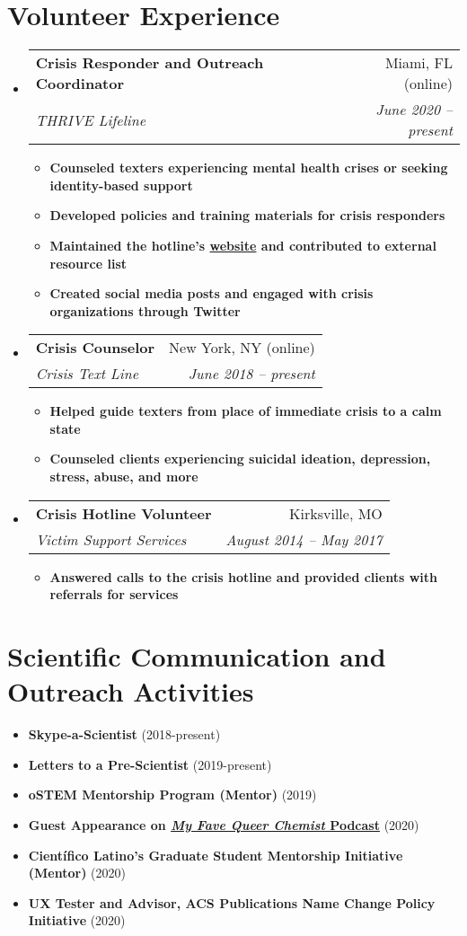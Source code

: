 \documentclass[letterpaper,11pt]{article}
\makeatletter
\newcommand{\resumeItem}[2]{
  \item\small{
    \textbf{#1}{ #2 \vspace{-2pt}}
  }
}
\newcommand{\resumeSubheading}[4]{
  \vspace{-1pt}\item
    \begin{tabular*}{0.97\textwidth}[t]{l@{\extracolsep{\fill}}r}
      \textbf{#1} & #2 \\
      \textit{\small#3} & \textit{\small #4} \\
    \end{tabular*}\vspace{-5pt}
}
\newcommand{\resumeSubItem}[2]{\resumeItem{#1}{#2}\vspace{-4pt}}
\newcommand{\resumeSubHeadingListStart}{\begin{itemize}[leftmargin=*]}
\newcommand{\resumeSubHeadingListEnd}{\end{itemize}}
\newcommand{\resumeItemListStart}{\begin{itemize}}
\newcommand{\resumeItemListEnd}{\end{itemize}\vspace{-5pt}}
\makeatother
\begin{document}
\section{Volunteer Experience}
  \resumeSubHeadingListStart

    \resumeSubheading
      {Crisis Responder and Outreach Coordinator}{Miami, FL (online)}
      {THRIVE Lifeline}{June 2020 -- present}
      \resumeItemListStart
        \resumeItem{\textnormal{Counseled texters experiencing mental health crises or seeking identity-based support}}
          {}
        \resumeItem{\textnormal{Developed policies and training materials for crisis responders}}
          {}
        \resumeItem{\textnormal{Maintained the hotline's \href{https://thrivelifeline.org/}{website} and contributed to external resource list}}
          {}
        \resumeItem{\textnormal{Created social media posts and engaged with crisis organizations through Twitter}}
          {}
      \resumeItemListEnd

    \resumeSubheading
      {Crisis Counselor}{New York, NY (online)}
      {Crisis Text Line}{June 2018 -- present}
      \resumeItemListStart
        \resumeItem{\textnormal{Helped guide texters from place of immediate crisis to a calm state}}
          {}
        \resumeItem{\textnormal{Counseled clients experiencing suicidal ideation, depression, stress, abuse, and more}}
          {}
      \resumeItemListEnd

    \resumeSubheading
      {Crisis Hotline Volunteer}{Kirksville, MO}
      {Victim Support Services}{August 2014 -- May 2017}
      \resumeItemListStart
        \resumeItem{\textnormal{Answered calls to the crisis hotline and provided clients with referrals for services}}
          {}
      \resumeItemListEnd
  \resumeSubHeadingListEnd


\section{Scientific Communication and Outreach Activities}
  \resumeSubHeadingListStart
   \resumeSubItem{Skype-a-Scientist}
      {(2018-present)}
    \resumeSubItem{Letters to a Pre-Scientist}
      {(2019-present)}
    \resumeSubItem{oSTEM Mentorship Program (Mentor)}
      {(2019)}
    \resumeSubItem{Guest Appearance on \href{https://www.stitcher.com/show/my-fave-queer-chemist/episode/emmett-leddin-university-of-north-texas-69219314}{\emph{My Fave Queer Chemist} Podcast}}
      {(2020)}%
    \resumeSubItem{Cient\'{i}fico Latino's Graduate Student Mentorship Initiative (Mentor)}
      {(2020)}
    \resumeSubItem{UX Tester and Advisor, ACS Publications Name Change Policy Initiative}
      {(2020)}
  \resumeSubHeadingListEnd
\end{document}

